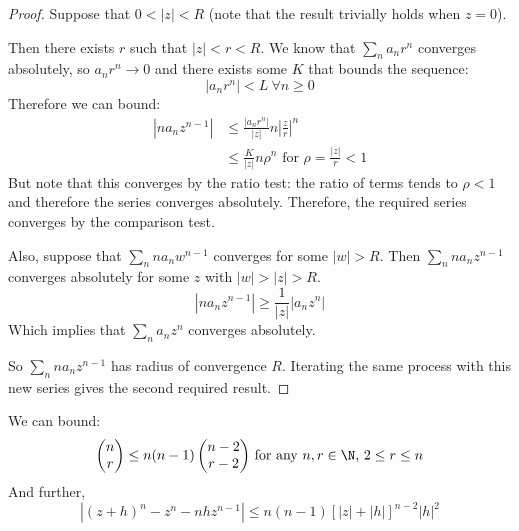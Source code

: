 \documentclass[../Main.tex]{subfiles}
\begin{document}
\begin{proof}
    Suppose that $0 < |z| < R$ (note that the result trivially holds when $z = 0$).\par
    Then there exists $r$ such that $|z| < r < R$. We know that $\sum_n a_n r^n$ converges absolutely, so $a_n r^n \to 0$ and there exists some $K$ that bounds the sequence:
    \begin{equation*}
        |a_n r^n| < L~\forall n \geq 0
    \end{equation*}
    Therefore we can bound:
    \begin{align*}
        |n a_n z^{n-1}| &\leq \frac{|a_n r^n|}{|z|} n \left|\frac{z}{r}\right|^n \\
        &\leq \frac{K}{|z|} n \rho^n \text{ for } \rho = \frac{|z|}{r} < 1
    \end{align*}
    But note that this converges by the ratio test: the ratio of terms tends to $\rho < 1$ and therefore the series converges absolutely. Therefore, the required series converges by the comparison test.\par
    Also, suppose that $\sum_n n a_n w^{n-1}$ converges for some $|w| > R$. Then $\sum_n n a_n z^{n-1}$ converges absolutely for some $z$ with $|w| > |z| > R$.
    \begin{equation*}
        |n a_n z^{n-1}| \geq \frac{1}{|z|} |a_n z^n|
    \end{equation*}
    Which implies that $\sum_n a_n z^n$ converges absolutely.\contradiction\par
    So $\sum_n n a_n z^{n-1}$ has radius of convergence $R$. Iterating the same process with this new series gives the second required result.
\end{proof}
\begin{lemma}
    We can bound: 
    \begin{equation*}
        \choose{n}{r} \leq n(n-1)\choose{n-2}{r-2}$ for any $n, r \in \N$, $2 \leq r \leq n
    \end{equation*}
    And further,
    \begin{equation*}
        |(z + h)^n - z^n - nhz^{n-1}| \leq n(n-1)[|z| + |h|]^{n-2} |h|^2
    \end{equation*}
    \label{lemChooseBounds}
\end{lemma}
\end{document}
